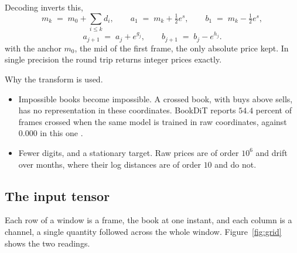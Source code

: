 \documentclass[10pt,a4paper]{article}
\begin{document}
Decoding inverts this,
%
\begin{equation}
m_k \;=\; m_0 + \sum_{i\le k} d_i, \qquad
a_1 \;=\; m_k + \tfrac{1}{2}e^{s}, \qquad
b_1 \;=\; m_k - \tfrac{1}{2}e^{s},
\label{eq:decodetouch}
\end{equation}
%
\begin{equation}
a_{j+1} \;=\; a_j + e^{g_j}, \qquad
b_{j+1} \;=\; b_j - e^{h_j} .
\label{eq:decodeladder}
\end{equation}
%
with the anchor $m_0$, the mid of the first frame, the only absolute price
kept. In single precision the round trip returns integer prices exactly.

Why the transform is used.

\begin{itemize}\setlength{\itemsep}{1pt}
\item Impossible books become impossible. A crossed book, with buys above
      sells, has no representation in these coordinates. BookDiT reports
      $54.4$ percent of frames crossed when the same model is trained in raw
      coordinates, against $0.000$ in this one \cite{bookdit}.
\item Fewer digits, and a stationary target. Raw prices are of order $10^6$ and
      drift over months, where their log distances are of order $10$ and do
      not.
\end{itemize}

\subsection{The input tensor}

Each row of a window is a frame, the book at one instant, and each column is a
channel, a single quantity followed across the whole window.
Figure~\ref{fig:grid} shows the two readings.
\end{document}
